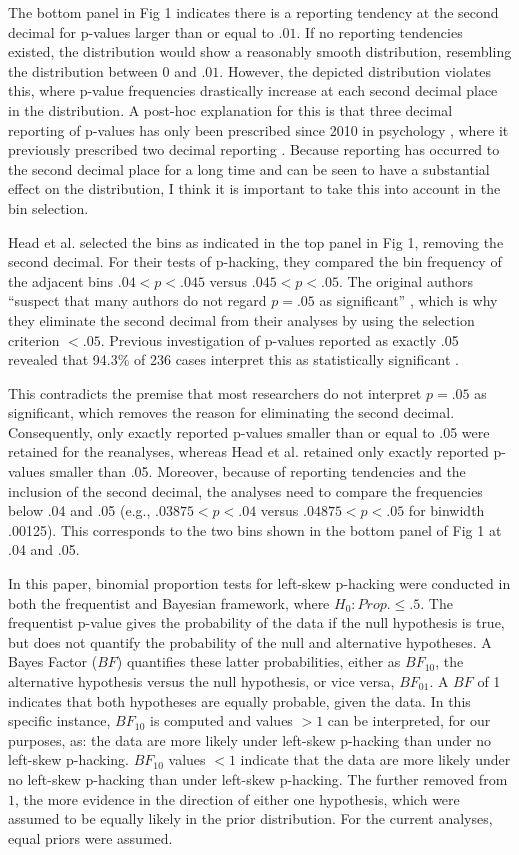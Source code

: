 The bottom panel in Fig 1 indicates there is a reporting tendency at the second decimal for p-values larger than or equal to $.01$. If no reporting tendencies existed, the distribution would show a reasonably smooth distribution, resembling the distribution between $0$ and $.01$. However, the depicted distribution violates this, where p-value frequencies drastically increase at each second decimal place in the distribution. A post-hoc explanation for this is that three decimal reporting of p-values has only been prescribed since 2010 in psychology \cite{American_Psychological_Association2010-qe}, where it previously prescribed two decimal reporting \cite{American_Psychological_Association1983-yf, American_Psychological_Association2001-uw}. Because reporting has occurred to the second decimal place for a long time and can be seen to have a substantial effect on the distribution, I think it is important to take this into account in the bin selection.

Head et al. selected the bins as indicated in the top panel in Fig 1, removing the second decimal. For their tests of p-hacking, they compared the bin frequency of the adjacent bins $.04<p<.045$ versus $.045<p<.05$. The original authors “suspect that many authors do not regard $p=.05$ as significant” \cite{Head_2015}, which is why they eliminate the second decimal from their analyses by using the selection criterion $<.05$. Previous investigation of p-values reported as exactly .05 revealed that 94.3\% of 236 cases interpret this as statistically significant \cite{Nuijten2015}.

This contradicts the premise that most researchers do not interpret $p=.05$ as significant, which removes the reason for eliminating the second decimal. Consequently, only exactly reported p-values smaller than or equal to .05 were retained for the reanalyses, whereas Head et al. retained only exactly reported p-values smaller than .05. Moreover, because of reporting tendencies and the inclusion of the second decimal, the analyses need to compare the frequencies below .04 and .05 (e.g., $.03875<p<.04$ versus $.04875<p<.05$ for binwidth .00125). This corresponds to the two bins shown in the bottom panel of Fig 1 at .04 and .05.

In this paper, binomial proportion tests for left-skew p-hacking were conducted in both the frequentist and Bayesian framework, where $H_0:Prop.\leq.5$. The frequentist p-value gives the probability of the data if the null hypothesis is true, but does not quantify the probability of the null and alternative hypotheses. A Bayes Factor ($BF$) quantifies these latter probabilities, either as $BF_{10}$, the alternative hypothesis versus the null hypothesis, or vice versa, $BF_{01}$. A $BF$ of 1 indicates that both hypotheses are equally probable, given the data. In this specific instance, $BF_{10}$ is computed and values $>1$ can be interpreted, for our purposes, as: the data are more likely under left-skew p-hacking than under no left-skew p-hacking. $BF_{10}$ values $<1$ indicate that the data are more likely under no left-skew p-hacking than under left-skew p-hacking. The further removed from $1$, the more evidence in the direction of either one hypothesis, which were assumed to be equally likely in the prior distribution. For the current analyses, equal priors were assumed.
  